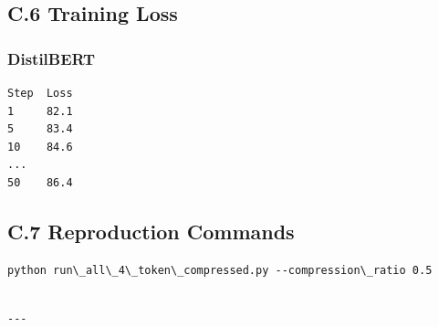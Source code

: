 \subsection{C.6 Training Loss}

\subsubsection{DistilBERT}
\begin{lstlisting}
Step  Loss
1     82.1
5     83.4
10    84.6
...
50    86.4
\end{lstlisting}

\subsection{C.7 Reproduction Commands}

\begin{lstlisting}
python run\_all\_4\_token\_compressed.py --compression\_ratio 0.5
\end{lstlisting}
\begin{lstlisting}

---
\end{lstlisting}